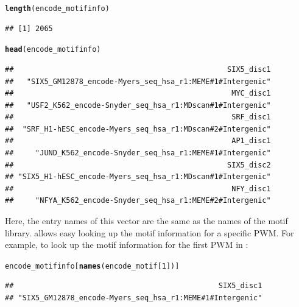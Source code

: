 \documentclass[a4paper,10pt]{article}\usepackage[]{graphicx}\usepackage[]{color}
\makeatletter
\newcommand{\hlnum}[1]{\textcolor[rgb]{0.686,0.059,0.569}{#1}}%
\newcommand{\hlstd}[1]{\textcolor[rgb]{0.345,0.345,0.345}{#1}}%
\newcommand{\hlkwd}[1]{\textcolor[rgb]{0.737,0.353,0.396}{\textbf{#1}}}%
\newenvironment{kframe}{%
 \def\at@end@of@kframe{}%
 \ifinner\ifhmode%
  \def\at@end@of@kframe{\end{minipage}}%
  \begin{minipage}{\columnwidth}%
 \fi\fi%
 \def\FrameCommand##1{\hskip\@totalleftmargin \hskip-\fboxsep
 \colorbox{shadecolor}{##1}\hskip-\fboxsep
     \hskip-\linewidth \hskip-\@totalleftmargin \hskip\columnwidth}%
 \MakeFramed {\advance\hsize-\width
   \@totalleftmargin\z@ \linewidth\hsize
   \@setminipage}}%
 {\par\unskip\endMakeFramed%
 \at@end@of@kframe}
\newenvironment{knitrout}{}{} %
\makeatother
\begin{document}
\begin{knitrout}
\color{fgcolor}\begin{kframe}
\begin{alltt}
\hlkwd{length}\hlstd{(encode_motifinfo)}
\end{alltt}
\begin{verbatim}
## [1] 2065
\end{verbatim}
\begin{alltt}
\hlkwd{head}\hlstd{(encode_motifinfo)}
\end{alltt}
\begin{verbatim}
##                                                 SIX5_disc1 
##   "SIX5_GM12878_encode-Myers_seq_hsa_r1:MEME#1#Intergenic" 
##                                                  MYC_disc1 
##   "USF2_K562_encode-Snyder_seq_hsa_r1:MDscan#1#Intergenic" 
##                                                  SRF_disc1 
##  "SRF_H1-hESC_encode-Myers_seq_hsa_r1:MDscan#2#Intergenic" 
##                                                  AP1_disc1 
##     "JUND_K562_encode-Snyder_seq_hsa_r1:MEME#1#Intergenic" 
##                                                 SIX5_disc2 
## "SIX5_H1-hESC_encode-Myers_seq_hsa_r1:MDscan#1#Intergenic" 
##                                                  NFY_disc1 
##     "NFYA_K562_encode-Snyder_seq_hsa_r1:MEME#2#Intergenic"
\end{verbatim}
\end{kframe}
\end{knitrout}

Here, the entry names of this vector are the same as the names of the motif library.  allows easy looking up the motif information for a specific PWM. For example, to look up the motif information for the first PWM in :

\begin{knitrout}
\color{fgcolor}\begin{kframe}
\begin{alltt}
\hlstd{encode_motifinfo[}\hlkwd{names}\hlstd{(encode_motif[}\hlnum{1}\hlstd{])]}
\end{alltt}
\begin{verbatim}
##                                               SIX5_disc1 
## "SIX5_GM12878_encode-Myers_seq_hsa_r1:MEME#1#Intergenic"
\end{verbatim}
\end{kframe}
\end{knitrout}
\end{document}
